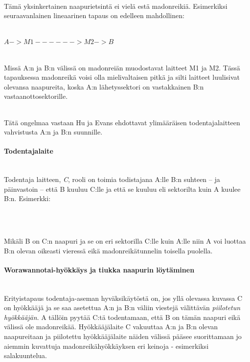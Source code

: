\documentclass[finnish]{tktltiki2}
\theoremstyle{definition}
\theoremstyle{remark}
\begin{document}
\noindent\\
Tämä yksinkertainen naapurietsintä ei vielä estä madonreikiä. Esimerkiksi seuraavanlainen lineaarinen tapaus on edelleen mahdollinen:

\noindent\\
$A -> M1 ------> M2 -> B$

\noindent\\
Missä A:n ja B:n välissä on madonreiän muodostavat laitteet M1 ja M2. Tässä tapauksessa madonreikä voisi olla mielivaltaisen pitkä ja silti laitteet luulisivat olevansa naapureita, koska A:n lähetyssektori on vastakkainen B:n vastaanottosektorille. 

\noindent\\
Tätä ongelmaa vastaan Hu ja Evans ehdottavat ylimääräisen todentajalaitteen vahvistusta A:n ja B:n suunnille.

\paragraph{Todentajalaite}
\noindent\\
Todentaja laitteen, \emph{C}, rooli on toimia todistajana A:lle B:n suhteen -- ja päinvastoin -- että B kuuluu C:lle ja että se kuuluu eli sektorilta kuin A kuulee B:n. Esimerkki:

\noindent\\

\noindent\\
Mikäli B on C:n naapuri ja se on eri sektorilla C:lle kuin A:lle niin A voi luottaa B:n olevan oikeasti vieressä eikä madonreikätunnelin toisella puolella.

\paragraph{Worawannotai-hyökkäys ja tiukka naapurin löytäminen}
\noindent\\
Erityistapaus todentaja-aseman hyväksikäytöstä on, jos yllä olevassa kuvassa C on hyökkääjä ja se saa asetettua A:n ja B:n väliin viestejä välittävän \emph{piilotetun hyökkääjän}. A tällöin pyytää C:tä todentamaan, että B on tämän naapuri eikä välissä ole madonreikää. Hyökkääjälaite C vakuuttaa A:n ja B:n olevan naapureitaan ja piilotettu hyökkääjälaite näiden välissä pääsee suorittamaan jo aiemmin kuvattuja madonreikähyökkäyksen eri keinoja - esimerkiksi salakuuntelua.
\end{document}

